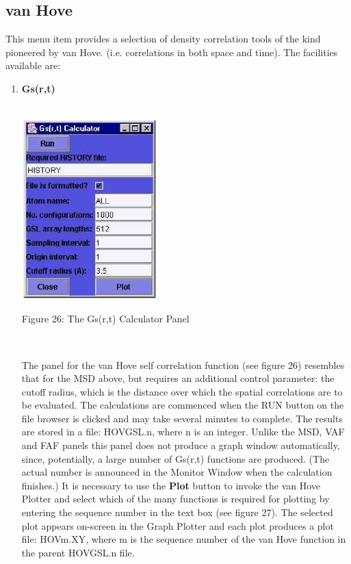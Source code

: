 \subsection{van Hove}
This menu item provides a selection of density correlation tools of the
kind pioneered by van Hove. (i.e. correlations in both space and
time). The facilities available are:
\begin{enumerate}
\item {\bf Gs(r,t)} \\

~

\begin{center}
\centerline{\includegraphics[height=7cm]{gself.ps}}
\centerline{Figure 26: The Gs(r,t) Calculator Panel}
\end{center}

~

The panel for the van Hove self correlation function (see figure
26) resembles that for the MSD above, but requires an
additional control parameter: the cutoff radius, which is the distance
over which the spatial correlations are to be evaluated. The
calculations are commenced when the RUN button on the file browser is
clicked and may take several minutes to complete. The results are
stored in a file: HOVGSL.n, where n is an integer.  Unlike the MSD,
VAF and FAF panels this panel does not produce a graph window
automatically, since, potentially, a large number of Gs(r,t) functions
are produced. (The actual number is announced in the Monitor Window
when the calculation finishes.)  It is necessary to use the {\bf Plot}
button to invoke the van Hove Plotter and select which of the many
functions is required for plotting by entering the sequence number in
the text box (see figure 27). The selected plot appears
on-screen in the Graph Plotter and each plot produces a plot file:
HOVm.XY, where m is the sequence number of the van Hove function in
the parent HOVGSL.n file.


\end{enumerate}
